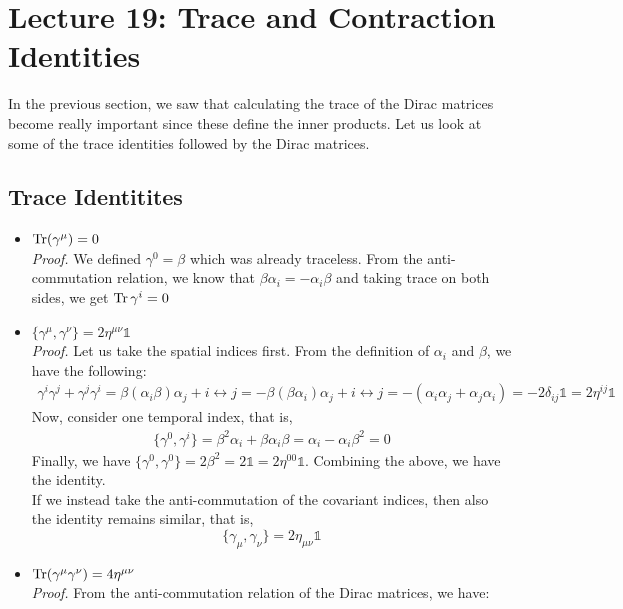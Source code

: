 \section*{Lecture 19: Trace and Contraction Identities}\label{sec:19}

In the previous section, we saw that calculating the trace of the Dirac matrices become really important since these define the inner products. Let us look at some of the trace identities followed by the Dirac matrices.
\subsection{Trace Identitites}
\begin{itemize}
    \item $\Tr(\gamma^\mu)=0$\\[0.2cm]
    \textit{Proof.} We defined $\gamma^0=\beta$ which was already traceless. From the anti-commutation relation, we know that $\beta \alpha_i = -\alpha_i \beta$ and taking trace on both sides, we get $\Tr \gamma^i = 0$
    \item $\{\gamma^\mu,\gamma^\nu\}=2\eta^{\mu\nu}\mathds{1}$\\[0.2cm]
    \textit{Proof.} Let us take the spatial indices first. From the definition of $\alpha_i$ and $\beta$, we have the following:
    \begin{align*}
        \gamma^i\gamma^j+\gamma^j\gamma^i = \beta (\alpha_i \beta) \alpha_j + i\leftrightarrow j=-\beta  (\beta \alpha_i)\alpha_j+ i\leftrightarrow j=-(\alpha_i\alpha_j +\alpha_j\alpha_i ) =-2\delta_{ij}\mathds{1}=2\eta^{ij}\mathds{1}
    \end{align*}
    Now, consider one temporal index, that is,
    \begin{align*}
        \{\gamma^0, \gamma^i\}= \beta^2 \alpha_i +\beta \alpha_i\beta =\alpha_i -\alpha_i\beta^2 =0
    \end{align*}
    Finally, we have $\{\gamma^0, \gamma^0\} = 2\beta^2 = 2\mathds{1}=2\eta^{00}\mathds{1}$. Combining the above, we have the identity. \\[0.2cm]
    If we instead take the anti-commutation of the covariant indices, then also the identity remains similar, that is,
    $$\{\gamma_{\mu}, \gamma_{\nu}\} = 2\eta_{\mu\nu}\mathds{1}$$
    \item $\Tr(\gamma^\mu\gamma^\nu)=4\eta^{\mu\nu}$\\[0.2cm]
    \textit{Proof.} From the anti-commutation relation of the Dirac matrices, we have:

\end{itemize}
